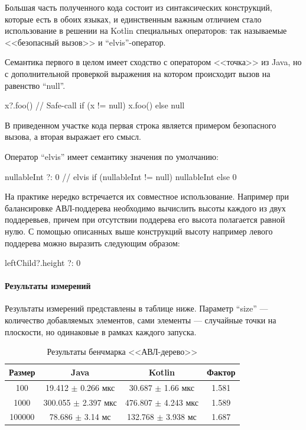 Большая часть полученного кода состоит из синтаксических конструкций, которые есть в обоих языках,
и единственным важным отличием стало использование в решении на Kotlin специальных операторов:
так называемые <<безопасный вызов>> и ``elvis''-оператор.

Семантика первого в целом имеет сходство с оператором <<точка>> из Java, но с дополнительной
проверкой выражения на котором происходит вызов на равенство ``null''.
\begin{pyglist}[language=kotlin]
x?.foo() // Safe-call
if (x != null) x.foo() else null
\end{pyglist}
В приведенном участке кода первая строка является примером безопасного вызова, а вторая
выражает его смысл.

Оператор ``elvis'' имеет семантику значения по умолчанию:
\begin{pyglist}[language=kotlin]
nullableInt ?: 0 // elvis
if (nullableInt != null) nullableInt else 0
\end{pyglist}

На практике нередко встречается их совместное использование.
Например при балансировке АВЛ-поддерева необходимо вычислить высоты каждого из двух поддеревьев,
причем при отсутствии поддерева его высота полагается равной нулю.
С помощью описанных выше конструкций высоту например левого поддерева можно выразить следующим
образом:
\begin{pyglist}[language=kotlin]
leftChild?.height ?: 0
\end{pyglist}

\paragraph{Результаты измерений}
Результаты измерений представлены в таблице ниже.
Параметр ``size'' --- количество добавляемых элементов, сами элементы --- случайные точки
на плоскости, но одинаковые в рамках каждого запуска.

\begin{table}[h]
\begin{center}
\begin{tabular}{|c|c|c|c|} \hline
Размер & Java & Kotlin & Фактор \\ \hline
100 & 19.412 $\pm$ 0.266 мкс & 30.687 $\pm$ 1.66 мкс & 1.581\\ \hline
1000 & 300.055 $\pm$ 2.397 мкс & 476.807 $\pm$ 4.243 мкс & 1.589\\ \hline
100000 & 78.686 $\pm$ 3.14 мс & 132.768 $\pm$ 3.938 мс & 1.687\\ \hline
\end{tabular}
\caption{Результаты бенчмарка <<АВЛ-дерево>>}
\end{center}
\end{table}


